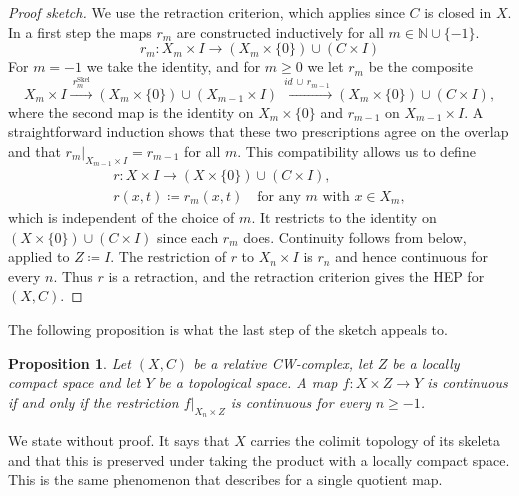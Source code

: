 \documentclass[11pt, a4paper, english]{article}
\newcommand{\restrict}[2]{\left.#1\right|_{#2}}
\theoremstyle{plain}
\newtheorem{proposition}[theorem]{Proposition}
\theoremstyle{definition}
\theoremstyle{remark}
\numberwithin{equation}{section}
\numberwithin{theorem}{section}
\begin{document}
\begin{proof}[Proof sketch]
    We use the retraction criterion, which applies since $C$ is closed in $X$. In a first step the maps $r_m$ are constructed inductively for all $m \in \mathbb{N} \cup \{-1\}$. 
    \[
        r_m \colon X_m \times I \to (X_m \times \{0\}) \cup (C \times I)
    \]
    For $m = -1$ we take the identity, and for $m \ge 0$ we let $r_m$ be the composite
    \[
        X_m \times I \xrightarrow{\ r^{\mathrm{Skel}}_m\ }
        (X_m \times \{0\}) \cup (X_{m-1} \times I)
        \xrightarrow{\ id\, \cup\, r_{m-1}\ }
        (X_m \times \{0\}) \cup (C \times I) ,
    \]
    where the second map is the identity on $X_m \times \{0\}$ and $r_{m-1}$ on $X_{m-1} \times I$. A straightforward induction shows that these two prescriptions agree on the overlap and that $\restrict{r_m}{X_{m-1} \times I} = r_{m-1}$ for all $m$. This compatibility allows us to define
    \begin{align*}
        r \colon X \times I \longrightarrow (X \times \{0\}) \cup (C \times I), \qquad \\
        r(x,t) \coloneqq r_m(x,t) \quad \text{for any } m \text{ with } x \in X_m ,
    \end{align*}  
    which is independent of the choice of $m$. It restricts to the identity on $(X \times \{0\}) \cup (C \times I)$ since each $r_m$ does. Continuity follows from  below, applied to $Z \coloneqq I$. The restriction of $r$ to $X_n \times I$ is $r_n$ and hence continuous for every $n$. Thus $r$ is a retraction, and the retraction criterion gives the HEP for $(X,C)$.
\end{proof}

The following proposition is what the last step of the sketch appeals to.

\begin{proposition} \label{prop:CWcontinuity}
    Let $(X,C)$ be a relative CW-complex, let $Z$ be a locally compact space and let $Y$ be a topological space. A map $f \colon X \times Z \to Y$ is continuous if and only if the restriction $\restrict{f}{X_n \times Z}$ is continuous for every $n \ge -1$.
\end{proposition}

We state  without proof. It says that $X$ carries the colimit topology of its skeleta and that this is preserved under taking the product with a locally compact space. This is the same phenomenon that  describes for a single quotient map.
\end{document}
